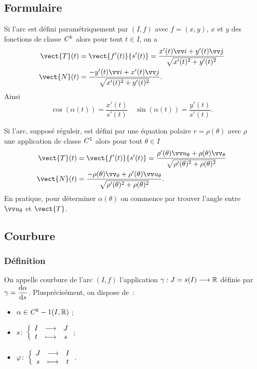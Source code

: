 \subsection{Formulaire}

Si l'arc est défini paramétriquement par $(I,f)$ avec $f=(x,y)$, $x$ et $y$ des fonctions de classe $\mathit{C}^k$ alors pour tout $t \in I$, on a
\begin{align}
  \vect{T}(t) &= \vect{f'(t)}{s'(t)} = \frac{x'(t)\vi+y'(t)\vj}{\sqrt{x'(t)^2+y'(t)^2}} \\
  \vect{N}(t) &= \frac{-y'(t)\vi+x'(t)\vj}{\sqrt{x'(t)^2+y'(t)^2}}.
\end{align}
Ainsi
\begin{equation}
  \cos(\alpha(t)) = \frac{x'(t)}{s'(t)} \quad \sin(\alpha(t)) = \frac{y'(t)}{s'(t)}.
\end{equation}

Si l'arc, supposé réguleir, est défini par une équation polaire $r=\rho(\theta)$ avec $\rho$ une application de classe $\mathit{C}^1$ alors pour tout $\theta \in I$
\begin{align}
  \vect{T}(t) &= \vect{f'(t)}{s'(t)} = \frac{\rho'(\theta)\vu_\theta+\rho(\theta)\vv_\theta}{\sqrt{\rho'(\theta)^2+\rho(\theta)^2}} \\
  \vect{N}(t) &= \frac{-\rho(\theta)\vv_\theta+\rho'(\theta)\vu_\theta}{\sqrt{\rho'(\theta)^2+\rho(\theta)^2}}.
\end{align}
En pratique, pour déterminer $\alpha(\theta)$ on commence par trouver l'angle entre $\vu_\theta$ et $\vect{T}$.

\subsection{Courbure}

\subsubsection{Définition}

On appelle courbure de l'arc $(I, f)$ l'application $\gamma : J=s(I) \longrightarrow \mathbb{R}$ définie par $\gamma=\dfrac{\mathrm{d} \alpha}{\mathrm{d} s}$. Plusprécisément, on dispose de~:
\begin{itemize}
\item $\alpha \in \mathit{C}^k-1(I, \mathbb{R})$ ;
\item $s\colon \left\{\begin{array}{ccc} I & \longrightarrow &J\\ t & \longmapsto & s \end{array} \right.$;
\item $\varphi\colon \left\{\begin{array}{ccc} J & \longrightarrow &I\\ s & \longmapsto & t \end{array} \right.$.
\end{itemize}

